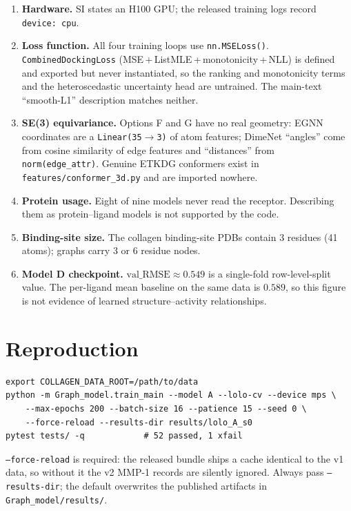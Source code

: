 \documentclass[11pt,a4paper]{article}
\newcommand{\code}[1]{\texttt{\small #1}}
\begin{document}
\begin{enumerate}\itemsep2pt
  \item \textbf{Hardware.} SI states an H100 GPU; the released training
        logs record \code{device: cpu}.
  \item \textbf{Loss function.} All four training loops use
        \code{nn.MSELoss()}. \code{CombinedDockingLoss}
        (MSE\,+\,ListMLE\,+\,monotonicity\,+\,NLL) is defined and exported
        but never instantiated, so the ranking and monotonicity terms and
        the heteroscedastic uncertainty head are untrained. The
        main-text ``smooth-L1'' description matches neither.
  \item \textbf{SE(3) equivariance.} Options F and G have no real
        geometry: EGNN coordinates are a \code{Linear(35$\to$3)} of atom
        features; DimeNet ``angles'' come from cosine similarity of edge
        features and ``distances'' from \code{norm(edge\_attr)}. Genuine
        ETKDG conformers exist in \code{features/conformer\_3d.py} and are
        imported nowhere.
  \item \textbf{Protein usage.} Eight of nine models never read the
        receptor. Describing them as protein--ligand models is not
        supported by the code.
  \item \textbf{Binding-site size.} The collagen binding-site PDBs contain
        3 residues (41 atoms); graphs carry 3 or 6 residue nodes.
  \item \textbf{Model D checkpoint.} $\text{val\_RMSE} \approx 0.549$ is a
        single-fold row-level-split value. The per-ligand mean baseline on
        the same data is $0.589$, so this figure is not evidence of
        learned structure--activity relationships.
\end{enumerate}

\section*{Reproduction}

\begin{verbatim}
export COLLAGEN_DATA_ROOT=/path/to/data
python -m Graph_model.train_main --model A --lolo-cv --device mps \
    --max-epochs 200 --batch-size 16 --patience 15 --seed 0 \
    --force-reload --results-dir results/lolo_A_s0
pytest tests/ -q            # 52 passed, 1 xfail
\end{verbatim}

\noindent
\code{--force-reload} is required: the released bundle ships a cache
identical to the v1 data, so without it the v2 MMP-1 records are silently
ignored. Always pass \code{--results-dir}; the default overwrites the
published artifacts in \code{Graph\_model/results/}.
\end{document}
